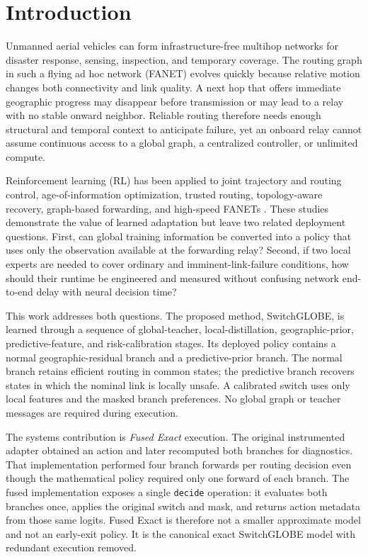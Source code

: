 \documentclass[drones,article,submit,moreauthors]{Definitions/mdpi}
\newcommand{\SG}{SwitchGLOBE}
\begin{document}
\section{Introduction}

Unmanned aerial vehicles can form infrastructure-free multihop networks for disaster response, sensing, inspection, and temporary coverage. The routing graph in such a flying ad hoc network (FANET) evolves quickly because relative motion changes both connectivity and link quality. A next hop that offers immediate geographic progress may disappear before transmission or may lead to a relay with no stable onward neighbor. Reliable routing therefore needs enough structural and temporal context to anticipate failure, yet an onboard relay cannot assume continuous access to a global graph, a centralized controller, or unlimited compute.

Reinforcement learning (RL) has been applied to joint trajectory and routing control, age-of-information optimization, trusted routing, topology-aware recovery, graph-based forwarding, and high-speed FANETs \cite{alam2024joint,wu2026aoi,jia2025trusted,cui2022tarraq,zhang2025gat,shou2026adaptive}. These studies demonstrate the value of learned adaptation but leave two related deployment questions. First, can global training information be converted into a policy that uses only the observation available at the forwarding relay? Second, if two local experts are needed to cover ordinary and imminent-link-failure conditions, how should their runtime be engineered and measured without confusing network end-to-end delay with neural decision time?

This work addresses both questions. The proposed method, \SG{}, is learned through a sequence of global-teacher, local-distillation, geographic-prior, predictive-feature, and risk-calibration stages. Its deployed policy contains a normal geographic-residual branch and a predictive-prior branch. The normal branch retains efficient routing in common states; the predictive branch recovers states in which the nominal link is locally unsafe. A calibrated switch uses only local features and the masked branch preferences. No global graph or teacher messages are required during execution.

The systems contribution is \emph{Fused Exact} execution. The original instrumented adapter obtained an action and later recomputed both branches for diagnostics. That implementation performed four branch forwards per routing decision even though the mathematical policy required only one forward of each branch. The fused implementation exposes a single \texttt{decide} operation: it evaluates both branches once, applies the original switch and mask, and returns action metadata from those same logits. Fused Exact is therefore not a smaller approximate model and not an early-exit policy. It is the canonical exact \SG{} model with redundant execution removed.
\end{document}
